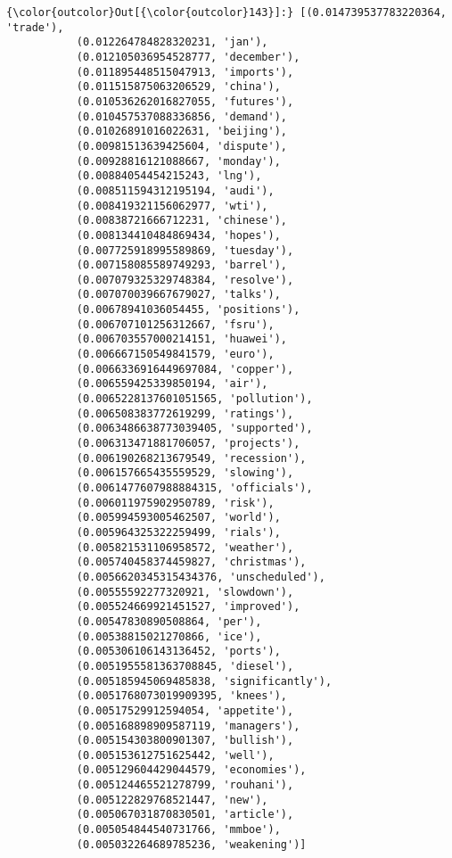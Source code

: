 \documentclass[11pt]{article}
\begin{document}
\begin{Verbatim}[commandchars=\\\{\}]
{\color{outcolor}Out[{\color{outcolor}143}]:} [(0.014739537783220364, 'trade'),
           (0.012264784828320231, 'jan'),
           (0.012105036954528777, 'december'),
           (0.011895448515047913, 'imports'),
           (0.011515875063206529, 'china'),
           (0.010536262016827055, 'futures'),
           (0.010457537088336856, 'demand'),
           (0.01026891016022631, 'beijing'),
           (0.00981513639425604, 'dispute'),
           (0.00928816121088667, 'monday'),
           (0.00884054454215243, 'lng'),
           (0.008511594312195194, 'audi'),
           (0.008419321156062977, 'wti'),
           (0.00838721666712231, 'chinese'),
           (0.008134410484869434, 'hopes'),
           (0.007725918995589869, 'tuesday'),
           (0.007158085589749293, 'barrel'),
           (0.007079325329748384, 'resolve'),
           (0.007070039667679027, 'talks'),
           (0.00678941036054455, 'positions'),
           (0.006707101256312667, 'fsru'),
           (0.006703557000214151, 'huawei'),
           (0.006667150549841579, 'euro'),
           (0.0066336916449697084, 'copper'),
           (0.006559425339850194, 'air'),
           (0.0065228137601051565, 'pollution'),
           (0.006508383772619299, 'ratings'),
           (0.0063486638773039405, 'supported'),
           (0.006313471881706057, 'projects'),
           (0.006190268213679549, 'recession'),
           (0.006157665435559529, 'slowing'),
           (0.0061477607988884315, 'officials'),
           (0.006011975902950789, 'risk'),
           (0.005994593005462507, 'world'),
           (0.005964325322259499, 'rials'),
           (0.005821531106958572, 'weather'),
           (0.005740458374459827, 'christmas'),
           (0.0056620345315434376, 'unscheduled'),
           (0.00555592277320921, 'slowdown'),
           (0.005524669921451527, 'improved'),
           (0.00547830890508864, 'per'),
           (0.00538815021270866, 'ice'),
           (0.005306106143136452, 'ports'),
           (0.0051955581363708845, 'diesel'),
           (0.005185945069485838, 'significantly'),
           (0.0051768073019909395, 'knees'),
           (0.00517529912594054, 'appetite'),
           (0.005168898909587119, 'managers'),
           (0.005154303800901307, 'bullish'),
           (0.005153612751625442, 'well'),
           (0.005129604429044579, 'economies'),
           (0.005124465521278799, 'rouhani'),
           (0.005122829768521447, 'new'),
           (0.005067031870830501, 'article'),
           (0.005054844540731766, 'mmboe'),
           (0.005032264689785236, 'weakening')]
\end{Verbatim}
            

    
    
    
    
\end{document}
